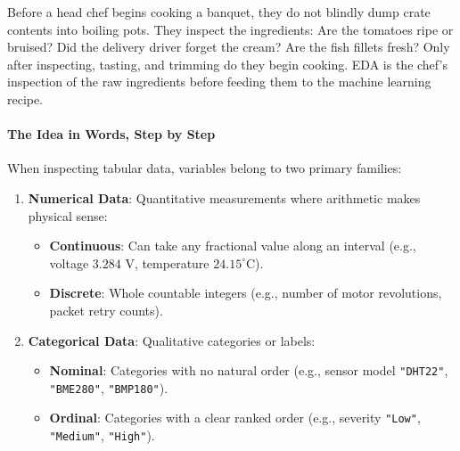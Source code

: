 \begin{analogy}
Before a head chef begins cooking a banquet, they do not blindly dump crate contents into boiling pots. They inspect the ingredients: Are the tomatoes ripe or bruised? Did the delivery driver forget the cream? Are the fish fillets fresh? Only after inspecting, tasting, and trimming do they begin cooking. EDA is the chef's inspection of the raw ingredients before feeding them to the machine learning recipe.
\end{analogy}

\paragraph{The Idea in Words, Step by Step}
When inspecting tabular data, variables belong to two primary families:
\begin{enumerate}
    \item \textbf{Numerical Data}: Quantitative measurements where arithmetic makes physical sense:
    \begin{itemize}
        \item \textbf{Continuous}: Can take any fractional value along an interval (e.g., voltage $3.284\text{ V}$, temperature $24.15^\circ\text{C}$).
        \item \textbf{Discrete}: Whole countable integers (e.g., number of motor revolutions, packet retry counts).
    \end{itemize}
    \item \textbf{Categorical Data}: Qualitative categories or labels:
    \begin{itemize}
        \item \textbf{Nominal}: Categories with no natural order (e.g., sensor model \texttt{"DHT22"}, \texttt{"BME280"}, \texttt{"BMP180"}).
        \item \textbf{Ordinal}: Categories with a clear ranked order (e.g., severity \texttt{"Low"}, \texttt{"Medium"}, \texttt{"High"}).
    \end{itemize}
\end{enumerate}

